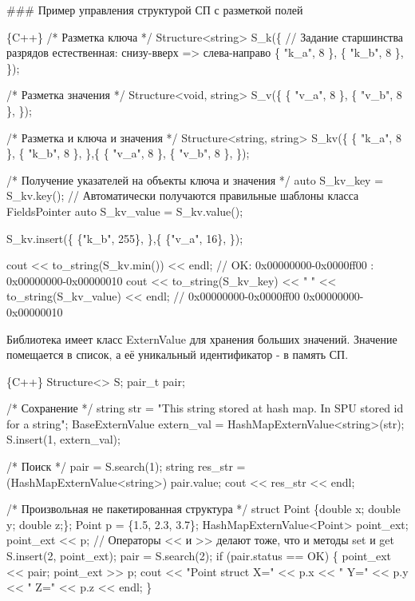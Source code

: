 \#\#\# Пример управления структурой СП с разметкой полей 
\begin{DoxyCode}
\{C++\}
  /* Разметка ключа */
  Structure<string> S\_k(\{ // Задание старшинства разрядов естественная: снизу-вверх => слева-направо
    \{ "k\_a", 8 \},
    \{ "k\_b", 8 \},
  \});

  /* Разметка значения */
  Structure<void, string> S\_v(\{
    \{ "v\_a", 8 \},
    \{ "v\_b", 8 \},
  \});

  /* Разметка и ключа и значения */
  Structure<string, string> S\_kv(\{
    \{ "k\_a", 8 \},
    \{ "k\_b", 8 \},
  \},\{
    \{ "v\_a", 8 \},
    \{ "v\_b", 8 \},
  \});

  /* Получение указателей на объекты ключа и значения */
  auto S\_kv\_key   = S\_kv.key();  // Автоматически получаются правильные шаблоны класса FieldsPointer
  auto S\_kv\_value = S\_kv.value();

  S\_kv.insert(\{
    \{"k\_b", 255\},
  \},\{
    \{"v\_a", 16\},
  \});

  cout << to\_string(S\_kv.min()) << endl;                               // OK: 0x00000000-0x0000ff00 :
       0x00000000-0x00000010
  cout << to\_string(S\_kv\_key) << " " << to\_string(S\_kv\_value) << endl; // 0x00000000-0x0000ff00
       0x00000000-0x00000010
\end{DoxyCode}
 



Библиотека имеет класс {\ttfamily Extern\+Value} для хранения больших значений. Значение помещается в список, а её уникальный идентификатор -\/ в память СП.


\begin{DoxyCode}
\{C++\}
  Structure<> S;
  pair\_t pair;

  /* Сохранение */
  string str = "This string stored at hash map. In SPU stored id for a string";
  BaseExternValue extern\_val = HashMapExternValue<string>(str);
  S.insert(1, extern\_val);

  /* Поиск */
  pair = S.search(1);
  string res\_str = (HashMapExternValue<string>) pair.value;
  cout << res\_str << endl;

  /* Произвольная не пакетированная структура */
  struct Point \{double x; double y; double z;\};
  Point p = \{1.5, 2.3, 3.7\};
  HashMapExternValue<Point> point\_ext;
  point\_ext << p; // Операторы << и >> делают тоже, что и методы set и get
  S.insert(2, point\_ext);
  pair = S.search(2);
  if (pair.status == OK) \{
      point\_ext << pair;
      point\_ext >> p;
      cout << "Point struct X=" << p.x << " Y=" << p.y << " Z=" << p.z << endl;
  \}
\end{DoxyCode}
 



